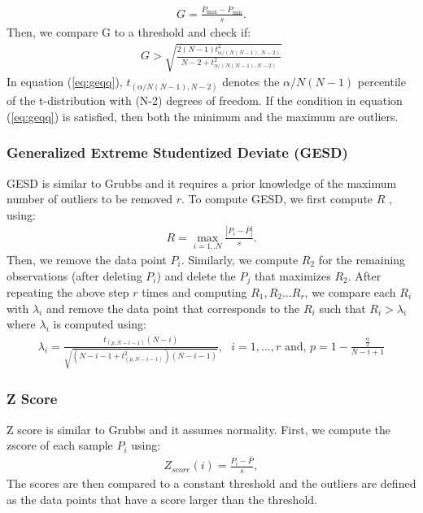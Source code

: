 \begin{eqnarray}\label{eq:geq}
G={\frac  {P_{\max }-P_{\min }}{s}}.
\end{eqnarray}
Then, we compare G to a threshold and check if:
\begin{eqnarray}\label{eq:geqq}
 G>{\sqrt  {{\frac  {2(N-1)t_{{\alpha /(N(N-1),N-2)}}^{2}}{N-2+t_{{\alpha /(N(N-1),N-2)}}^{2}}}}} 
\end{eqnarray}
In equation (\ref{eq:geqq}), $t_{(\alpha/N(N-1),N-2)} $ denotes the $\alpha/N(N-1)$ percentile of the t-distribution with (N-2) degrees of freedom. If the condition in equation (\ref{eq:geqq}) is satisfied, then both the minimum and the maximum are outliers.\\
\subsubsection{Generalized Extreme Studentized Deviate (GESD)}
GESD \cite{Rosner} is similar to Grubbs and it requires a prior knowledge of the maximum number of outliers to be removed $r$.
To compute GESD, we first compute $R$ , using: 
\begin{eqnarray}
R=\max_{i=1..N}{\frac{|P_i-\bar{P}|}{s}}.
\end{eqnarray}
Then, we remove the data point $P_i$.
Similarly, we compute $R_2$ for the remaining observations (after deleting $P_i$) and delete the $P_j$ that maximizes $R_2$. After repeating the above step $r$ times and computing $R_1, R_2 \dots R_r$, we compare each $R_i$ with $\lambda_i$ and remove the data point that corresponds to the $R_i$ such that $R_i > \lambda_i$ where $\lambda_i$ is computed using:
\begin{eqnarray}
\lambda_i=\frac{t_{(p,N-i-1)}(N-i)}{\sqrt{(N-i-1+t_{(p,N-i-1)}^{2})(N-i-1)}}, \text{ $i=1,...,r$ and, } p=1- \frac{\frac{\alpha}{2}}{N-i+1}
\end{eqnarray}
\subsubsection{Z Score}
Z score \cite{boris} is similar to Grubbs and it assumes normality. First, we compute the zscore of each sample $P_i$ using:
\begin{eqnarray}
Z_{score}(i)=\frac{P_i- \bar{P}}{s},
\end{eqnarray}
The scores are then compared to a constant threshold and the outliers are defined as the data points that have a score larger than the threshold.



